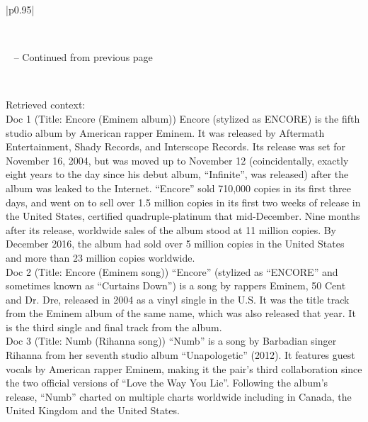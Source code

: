 \documentclass[11pt]{article}
\begin{document}
\begin{longtable}{|p{}|}
\caption{Despite retrieving two gold documents (Doc 3 and Doc 5) for the query, the single-step model hallucinates and provides the wrong answer, ``Encore.''} \label{tab:naive}\\
\hline
\endfirsthead

%
{{\tablename\ \thetable{} -- Continued from previous page}} \\
\hline
\endhead

\hline {} \\
\endfoot

\hline
\endlastfoot

Retrieved context: \\
Doc 1 (Title: Encore (Eminem album)) Encore (stylized as ENCORE) is the fifth studio album by American rapper Eminem. It was released by Aftermath Entertainment, Shady Records, and Interscope Records. Its release was set for November 16, 2004, but was moved up to November 12 (coincidentally, exactly eight years to the day since his debut album, ``Infinite'', was released) after the album was leaked to the Internet. ``Encore'' sold 710,000 copies in its first three days, and went on to sell over 1.5 million copies in its first two weeks of release in the United States, certified quadruple-platinum that mid-December. Nine months after its release, worldwide sales of the album stood at 11 million copies. By December 2016, the album had sold over 5 million copies in the United States and more than 23 million copies worldwide. \\
Doc 2 (Title: Encore (Eminem song)) ``Encore'' (stylized as ``ENCORE'' and sometimes known as ``Curtains Down'') is a song by rappers Eminem, 50 Cent and Dr. Dre, released in 2004 as a vinyl single in the U.S. It was the title track from the Eminem album of the same name, which was also released that year. It is the third single and final track from the album.\\
Doc 3 (Title: Numb (Rihanna song)) ``Numb'' is a song by Barbadian singer Rihanna from her seventh studio album ``Unapologetic'' (2012). It features guest vocals by American rapper Eminem, making it the pair's third collaboration since the two official versions of ``Love the Way You Lie''. Following the album's release, ``Numb'' charted on multiple charts worldwide including in Canada, the United Kingdom and the United States.\\

\end{longtable}
\end{document}
